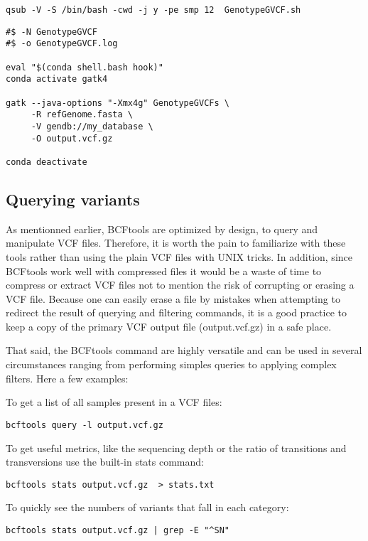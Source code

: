 \begin{verbatim}
qsub -V -S /bin/bash -cwd -j y -pe smp 12  GenotypeGVCF.sh
\end{verbatim}


\begin{verbatim}
#$ -N GenotypeGVCF
#$ -o GenotypeGVCF.log

eval "$(conda shell.bash hook)"
conda activate gatk4

gatk --java-options "-Xmx4g" GenotypeGVCFs \
	 -R refGenome.fasta \
	 -V gendb://my_database \
	 -O output.vcf.gz

conda deactivate
\end{verbatim}




\subsection{Querying variants}


As mentionned earlier, BCFtools are optimized by design, to query and manipulate VCF files. Therefore, it is worth the pain to familiarize with these tools rather than using the plain VCF files with UNIX tricks. In addition, since BCFtools work well with compressed files it would be a waste of time to compress or extract VCF files not to mention the risk of corrupting or erasing a VCF file. Because one can easily erase a file by mistakes when attempting to redirect the result of querying and filtering commands, it is a good practice to keep a copy of the primary VCF output file (output.vcf.gz) in a safe place.

That said, the BCFtools command are highly versatile and can be used in several circumstances ranging from performing simples queries to applying complex filters. Here a few examples:

To get a list of all samples present in a VCF files:

\begin{verbatim}
bcftools query -l output.vcf.gz
\end{verbatim}

To get useful metrics, like the sequencing depth or the ratio of transitions and transversions use the built-in stats command:
\begin{verbatim}
bcftools stats output.vcf.gz  > stats.txt
\end{verbatim}

To quickly see the numbers of variants that fall in each category:
\begin{verbatim}
bcftools stats output.vcf.gz | grep -E "^SN"
\end{verbatim}

